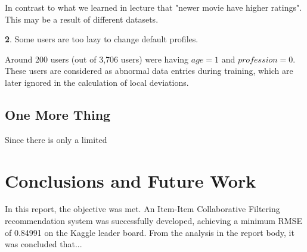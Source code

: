 \documentclass{ece}
\begin{document}
In contrast to what we learned in lecture that "newer movie have higher ratings".
This may be a result of different datasets.

\textbf{2}. Some users are too lazy to change default profiles.

Around 200 users (out of 3,706 users) were having $age=1$ and $profession=0$.
These users are considered as abnormal data entries during training, which are later ignored in the calculation of local deviations.

\subsection{One More Thing}

Since there is only a limited 

\section{Conclusions and Future Work}

In this report, the objective was met.
An Item-Item Collaborative Filtering recommendation system was successfully developed, achieving a minimum RMSE of 0.84991 on the Kaggle leader board.
From the analysis in the report body, it was concluded that...


\printbibliography[heading=none]


%
%
\end{document}

